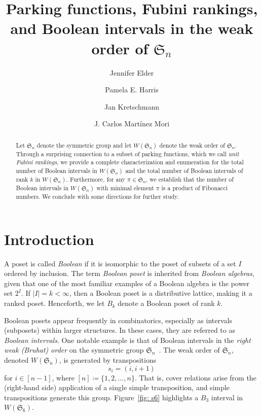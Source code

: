 \documentclass[11pt,reqno]{amsart}
\title{
    Parking functions, Fubini rankings, and Boolean intervals in the weak order of $\mathfrak{S}_n$
}
\author[Elder]{Jennifer Elder}
\author[Harris]{Pamela E. Harris}
\author[Kretschmann]{Jan Kretschmann}
\author[Mart\'inez Mori]{J. Carlos Mart\'inez Mori}
\newcommand{\Sym}{\mathfrak{S}}
\begin{document}

\begin{abstract}
Let $\mathfrak{S}_n$ denote the symmetric group and let $W(\mathfrak{S}_n)$ denote the weak order of $\mathfrak{S}_n$.
Through a surprising connection to a subset of parking functions, which we call \textit{unit Fubini rankings}, we provide a complete characterization and enumeration for the total number of Boolean intervals in $W(\mathfrak{S}_n)$ and the total number of Boolean intervals of rank $k$ in $W(\mathfrak{S}_n)$. 
Furthermore, for any $\pi\in\mathfrak{S}_n$, we establish that the number of Boolean intervals in $W(\mathfrak{S}_n)$ with minimal element $\pi$ is a product of Fibonacci numbers. 
We conclude with some directions for further study.
\end{abstract}

\maketitle


\section{Introduction}

A poset is called \emph{Boolean} if it is isomorphic to the poset of subsets of a set $I$ ordered by inclusion.
The term \emph{Boolean poset} is inherited from \textit{Boolean algebras}, given that one of the most familiar examples of a Boolean algebra is the power set $2^{I}$. 
If $|I| = k < \infty$, then a Boolean poset is a distributive lattice, making it a ranked poset.
Henceforth, we let $B_k$ denote a Boolean poset of rank $k$.

Boolean posets appear frequently in combinatorics, especially as intervals (subposets) within larger structures.
In these cases, they are referred to as \emph{Boolean intervals}.
One notable example is that of Boolean intervals in the \textit{right weak (Bruhat) order} on the symmetric group $\Sym_n$~\cite{bjorner2009shape, tenner2006reduced,tenner2007pattern,tenner2022interval}. 
The weak order of $\Sym_n$, denoted $W(\Sym_n)$, is generated by transpositions \[s_i = (i,i+1)\] for $i \in [n-1]$, where $[n] \coloneqq \{1, 2, \ldots, n\}$.
That is, cover relations arise from the (right-hand side) application of a single simple transposition, and simple transpositions generate this group.
Figure~\ref{fig: s6} highlights a $B_3$ interval in $W(\Sym_6)$.
\end{document}

